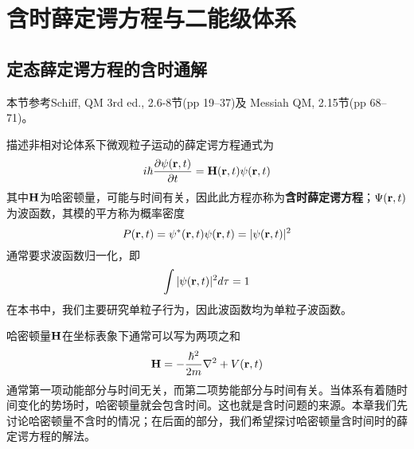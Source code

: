
\chapter{含时薛定谔方程与二能级体系}
\label{cpt:1}
\section{定态薛定谔方程的含时通解}
\begin{framed}
本节参考Schiff, QM 3rd ed., 2.6-8节(pp 19--37)及 Messiah QM, 2.15节(pp 68--71)。
\end{framed}

描述非相对论体系下微观粒子运动的薛定谔方程通式为
\begin{equation}\label{eqn:tdsefull}
i\hbar \dfrac{\partial \psi(\bm{\mathrm{r}},t)}{\partial t}=\bm{\mathrm{H}}(\bm{\mathrm{r}},t) \psi(\bm{\mathrm{r}},t)
\end{equation}
其中$ \bm{\mathrm{H}} $为哈密顿量，可能与时间有关，因此此方程亦称为\textbf{含时薛定谔方程}；$ \Psi(\bm{\mathrm{r}},t) $为波函数，其模的平方称为概率密度
\begin{equation}\label{key}
P(\bm{\mathrm{r}},t)=\psi^*(\bm{\mathrm{r}},t)\psi(\bm{\mathrm{r}},t)=|\psi(\bm{\mathrm{r}},t)|^2
\end{equation}
通常要求波函数归一化，即
\begin{equation}\label{key}
\int |\psi(\bm{\mathrm{r}},t)|^2d\tau=1
\end{equation}
在本书中，我们主要研究单粒子行为，因此波函数均为单粒子波函数。

哈密顿量$ \bm{\mathrm{H}} $在坐标表象下通常可以写为两项之和
\begin{equation}\label{key}
\bm{\mathrm{H}}=-\dfrac{\hbar^2}{2m}\nabla^2+V(\bm{\mathrm{r}},t)
\end{equation}
通常第一项动能部分与时间无关，而第二项势能部分与时间有关。当体系有着随时间变化的势场时，哈密顿量就会包含时间。这也就是含时问题的来源。本章我们先讨论哈密顿量不含时的情况；在后面的部分，我们希望探讨哈密顿量含时间时的薛定谔方程的解法。

